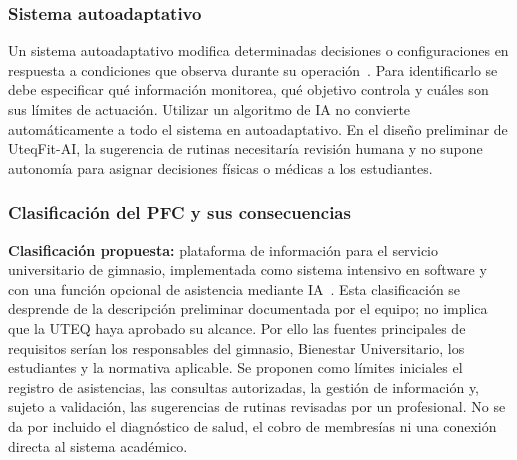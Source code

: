 \subsubsection{Sistema autoadaptativo}
Un sistema autoadaptativo modifica determinadas decisiones o configuraciones en respuesta a condiciones que observa durante su operación~\cite{pohl2025}. Para identificarlo se debe especificar qué información monitorea, qué objetivo controla y cuáles son sus límites de actuación. Utilizar un algoritmo de IA no convierte automáticamente a todo el sistema en autoadaptativo. En el diseño preliminar de UteqFit-AI, la sugerencia de rutinas necesitaría revisión humana y no supone autonomía para asignar decisiones físicas o médicas a los estudiantes.

\subsubsection{Clasificación del PFC y sus consecuencias}
\textbf{Clasificación propuesta:} plataforma de información para el servicio universitario de gimnasio, implementada como sistema intensivo en software y con una función opcional de asistencia mediante IA~\cite{swebok2024,pohl2025}. Esta clasificación se desprende de la descripción preliminar documentada por el equipo; no implica que la UTEQ haya aprobado su alcance. Por ello las fuentes principales de requisitos serían los responsables del gimnasio, Bienestar Universitario, los estudiantes y la normativa aplicable. Se proponen como límites iniciales el registro de asistencias, las consultas autorizadas, la gestión de información y, sujeto a validación, las sugerencias de rutinas revisadas por un profesional. No se da por incluido el diagnóstico de salud, el cobro de membresías ni una conexión directa al sistema académico.
